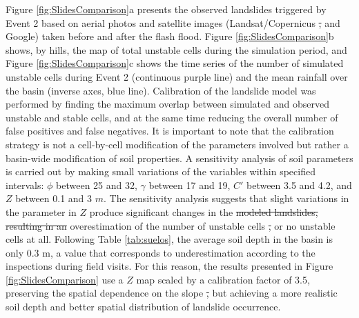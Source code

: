 \documentclass[hess, manuscript]{copernicus}
\providecommand{\DIFadd}[1]{{\protect\color{blue}\uwave{#1}}} %
\providecommand{\DIFdel}[1]{{\protect\color{red}\sout{#1}}}                      %
\providecommand{\DIFaddbegin}{} %
\providecommand{\DIFaddend}{} %
\providecommand{\DIFdelbegin}{} %
\providecommand{\DIFdelend}{} %
\begin{document}
Figure \ref{fig:SlidesComparison}a presents the observed landslides triggered by Event 2  based on aerial photos and satellite images (Landsat/Copernicus \DIFdelbegin \DIFdel{, }\DIFdelend and Google) taken before and after the flash flood.  Figure \ref{fig:SlidesComparison}b shows, by hills, the map of total unstable cells during the simulation period, and Figure \ref{fig:SlidesComparison}c shows the time series of the number of simulated unstable cells during Event 2 (continuous purple line) and the mean rainfall over the basin (inverse axes, blue line). Calibration of the landslide model was performed by finding the maximum overlap between simulated and observed unstable and stable cells, and at the same time reducing the overall number of false positives and false negatives. It is important to note that the calibration strategy is not a cell-by-cell modification of the parameters involved but rather a basin-wide modification of soil properties. A sensitivity analysis of soil parameters is carried out by making small variations of the variables within specified intervals: $\phi$ between 25 and 32, $\gamma$ between 17 and 19,  $C'$ between 3.5 and 4.2, and $Z$ between 0.1 and 3 $m$. The sensitivity analysis suggests that slight variations in the parameter in $Z$ produce significant changes in the \DIFdelbegin \DIFdel{modeled landslides, resulting in an }\DIFdelend \DIFaddbegin \DIFadd{results, with }\DIFaddend overestimation of the number of unstable cells \DIFdelbegin \DIFdel{, }\DIFdelend or no unstable cells at all. Following Table \ref{tab:suelos}, the average soil depth in the basin is only 0.3 m, a value that corresponds to underestimation according to the inspections during field visits. For this reason, the results presented in Figure \ref{fig:SlidesComparison} use a  $Z$ map scaled by a calibration factor of 3.5, preserving the spatial dependence on the slope \DIFdelbegin \DIFdel{, }\DIFdelend but achieving a more realistic soil depth and better spatial distribution of \DIFaddbegin \DIFadd{a }\DIFaddend landslide occurrence.\\ 
\end{document}
